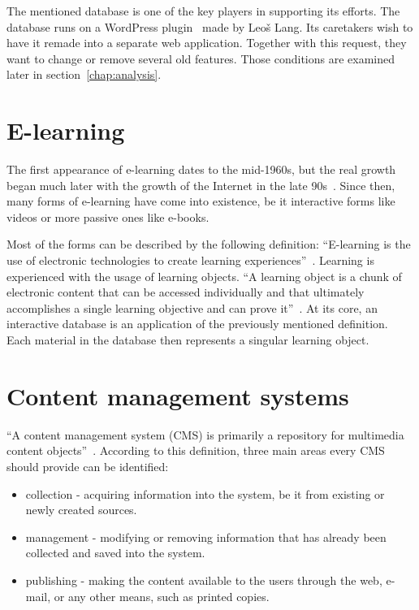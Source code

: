\documentclass[
  digital,     %
  oneside,     %
  nosansbold,  %
  colorbold, %
  lof,         %
  lot,         %
]{fithesis4}
\begin{document}
The mentioned database is one of the key players in supporting its efforts.
The database runs on a WordPress plugin~\cite{lang18} made by Leoš Lang.
Its caretakers wish to have it remade into a separate web application. Together
with this request, they want to change or remove several old features. Those
conditions are examined later in section~\ref{chap:analysis}.

\section{E-learning}

The first appearance of \mbox{e-learning} dates to the \mbox{mid-1960s}, but
the real growth began much later with the growth of the Internet in the late
90s~\cite{research_e-learning}. Since then, many forms of \mbox{e-learning}
have come into existence, be it interactive forms like videos or more passive
ones like \mbox{e-books}.

Most of the forms can be described by the following definition:  “E-learning is the use
of electronic technologies to create learning experiences”~\parencite[page.~1]{horton11}.
Learning is experienced with the usage of learning objects. “A learning object is a chunk
of electronic content that can be accessed individually and that ultimately accomplishes
a single learning objective and can prove it”~\parencite[page.~47]{horton11}. At its core,
an interactive database is an application of the previously mentioned definition.
Each material in the database then represents a singular learning object.

\section{Content management systems}

“A content management system (CMS) is primarily a repository for multimedia content
objects”~\parencite[page.~17]{mauthe04}. According to this definition, three main
areas every CMS should provide can be identified:

\begin{itemize}
    \item collection - acquiring information into the system, be it from existing
    or newly created sources.
    \item management - modifying or removing information that has already been
    collected and saved into the system.
    \item publishing - making the content available to the users through the web,
    e-mail, or any other means, such as printed copies.
\end{itemize}
\end{document}
